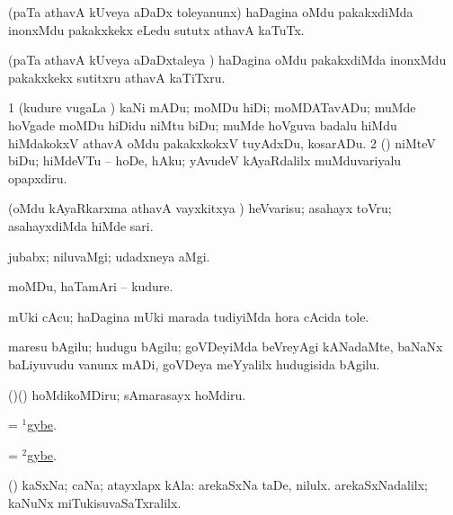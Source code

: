 \bentry
{}
\gl{\kirx}
\bmng
\emng

\noindent
\gl{\sakirx}
\bmng
(paTa athavA kUveya aDaDx toleyanunx) haDagina oMdu pakakxdiMda inonxMdu pakakxkekx eLedu sututx athavA kaTuTx. 
\emng

\noindent
\gl{\akirx}
\bmng
(paTa athavA kUveya aDaDxtaleya \vi) haDagina oMdu pakakxdiMda inonxMdu pakakxkekx sutitxru athavA kaTiTxru. 
\emng
\eentry

\bentry
{}
\gl{\akirx}
\bmng
\bnum
\num{1} (kudure \mo vugaLa \vi) kaNi mADu; moMDu hiDi; moMDATavADu; muMde hoVgade moMDu hiDidu niMtu biDu; muMde hoVguva badalu hiMdu hiMdakokxV athavA oMdu pakakxkokxV tuyAdxDu, kosarADu. 
\num{2} (\rUpa) niMteV biDu; hiMdeVTu -- hoDe, hAku; yAvudeV kAyaRdalilx muMduvariyalu opapxdiru. 
\enum
\emng

\noindent
\gl{\nuga}
\bmng
{} (oMdu kAyaRkarxma athavA vayxkitxya \vi) heVvarisu; asahayx toVru; asahayxdiMda hiMde sari. 
\emng
\eentry

\bentry
{}
\gl{\nA}
\bmng
jubabx; niluvaMgi; udadxneya aMgi. 
\emng
\eentry

\bentry
{}
\gl{\nA}
\bmng
moMDu, haTamAri -- kudure. 
\emng
\eentry

\bentry
{}
\gl{\nA}
\bmng
mUki cAcu; haDagina mUki marada tudiyiMda hora cAcida tole. 
\emng
\eentry

\bentry
{}
\gl{\nA}
\bmng
maresu bAgilu; hudugu bAgilu; goVDeyiMda beVreyAgi kANadaMte, baNaNx baLiyuvudu \mo vanunx mADi, goVDeya meYyalilx hudugisida bAgilu. 
\emng
\eentry

\bentry
{}
\gl{\akirx}
\bmng
(\ame)(\AmA) hoMdikoMDiru; sAmarasayx hoMdiru. 
\emng
\eentry

\bentry
{}
\gl{\kirx}
\bmng
= \hyperref{kandict_g.pdf}{G}{gybe(1)}{$^1$gybe}. 
\emng
\eentry

\bentry
{}
\gl{\nA}
\bmng
= \hyperref{kandict_g.pdf}{G}{gybe(2)}{$^2$gybe}. 
\emng
\eentry

\bentry
{}
\gl{\nA}
\bmng
(\AmA) kaSxNa; caNa; atayxlapx kAla:  arekaSxNa taDe, nilulx.  arekaSxNadalilx; kaNuNx miTukisuvaSaTxralilx. 
\emng
\eentry

